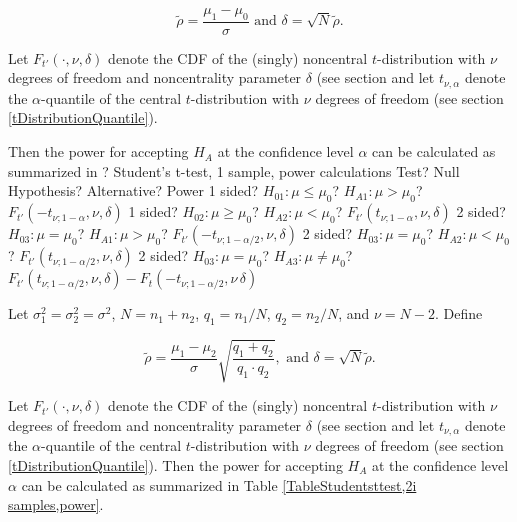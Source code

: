 \begin{equation} \label{eq:TTestPower1}
	\widetilde{\rho} = \frac{\mu_1-\mu_0}{\sigma} \text{ and } \delta = \sqrt{N} \widetilde{\rho}.
\end{equation}



\vspace{0.3cm}
Let $F_{t'}\left(\cdot, \nu, \delta \right)$ denote the CDF of the (singly) noncentral $t$-distribution with $\nu$ degrees of freedom and noncentrality parameter $\delta$ (see section 
and let $t_{\nu,\alpha}$ denote the $\alpha$-quantile of the central $t$-distribution with $\nu$ degrees of freedom (see section \ref{tDistributionQuantile}).


\mpTableFourColsTwoRowsThreeRows
{Then the power for accepting $H_A$ at the confidence level $\alpha$ can be calculated as summarized in ? Student's t-test, 1 sample, power calculations}
{Test? Null Hypothesis? Alternative? Power}
{1 sided? $H_{01}: \mu \leq \mu_0$? $H_{A1}: \mu > \mu_0$? $F_{t'}\left(-t_{\nu;1-\alpha}, \nu, \delta \right)$}
{1 sided? $H_{02}: \mu \geq \mu_0$? $H_{A2}: \mu < \mu_0$? $F_{t'}\left(t_{\nu;1-\alpha}, \nu, \delta \right)$}
{2 sided? $H_{03}: \mu = \mu_0$? $H_{A1}: \mu > \mu_0$? $F_{t'}\left(-t_{\nu;1-\alpha/2}, \nu, \delta \right)$}
{2 sided? $H_{03}: \mu = \mu_0$? $H_{A2}: \mu < \mu_0$? $F_{t'}\left(t_{\nu;1-\alpha/2}, \nu, \delta \right)$}
{2 sided? $H_{03}: \mu = \mu_0$? $H_{A3}: \mu \neq \mu_0$? $F_{t'}\left(t_{\nu;1-\alpha/2}, \nu, \delta \right)-F_t\left(-t_{\nu;1-\alpha/2}, \nu\, \delta \right)$}



\vspace{0.3cm}
Let $\sigma_1^2 = \sigma_2^2 = \sigma^2$, $N = n_1 + n_2$, $q_1 = n_1 /N$, $q_2 = n_2 /N$, and $\nu=N-2$. Define

\begin{equation} \label{eq:TTestPower2i}
	\widetilde{\rho} = \frac{\mu_1-\mu_2}{\sigma} \sqrt{\frac{q_1+q_2}{q_1 \cdot q_2}}, \text{ and } \delta = \sqrt{N} \widetilde{\rho}.
\end{equation}


Let $F_{t'}\left(\cdot, \nu, \delta \right)$ denote the CDF of the (singly) noncentral $t$-distribution with $\nu$ degrees of freedom and noncentrality parameter $\delta$ (see section 
and let $t_{\nu,\alpha}$ denote the $\alpha$-quantile of the central $t$-distribution with $\nu$ degrees of freedom (see section \ref{tDistributionQuantile}).
Then the power for accepting $H_A$ at the confidence level $\alpha$ can be calculated as summarized in Table \ref{TableStudentsttest,2i samples,power}.



